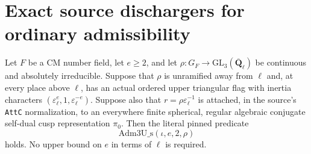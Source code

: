 \section{Exact source dischargers for ordinary admissibility}
\label{sec:kt-ordinary-admissibility-source}

\begin{proposition}
Let $F$ be a CM number field, let $e\geq2$, and let
$\rho:G_F\longrightarrow\mathrm{GL}_3(\overline{\mathbf Q}_\ell)$
be continuous and absolutely irreducible. Suppose that $\rho$ is
unramified away from $\ell$ and, at every place above $\ell$, has an
actual ordered upper triangular flag with inertia characters
$(\varepsilon_\ell^e,1,\varepsilon_\ell^{-e})$.
Suppose also that $r=\rho\varepsilon_\ell^{-1}$ is attached, in the
source's \texttt{AttC} normalization, to an everywhere finite spherical,
regular algebraic conjugate self-dual cusp representation $\pi_0$.
Then the literal pinned predicate
\[
                    \mathrm{Adm3U\_s}(\iota,e,2,\rho)
\]
holds. No upper bound on $e$ in terms of $\ell$ is required.
\end{proposition}

